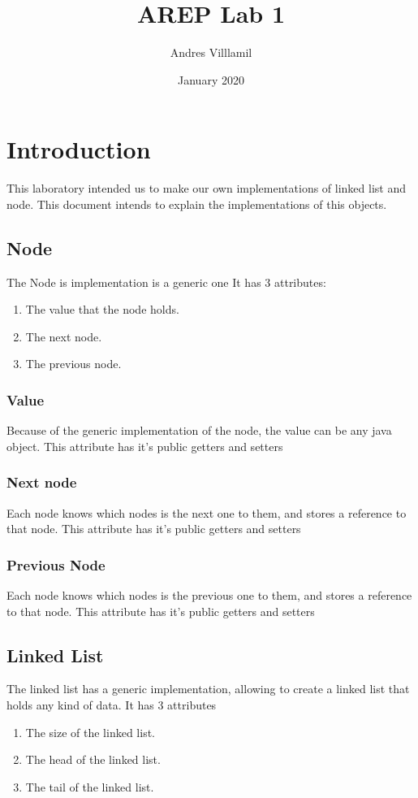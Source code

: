 \documentclass{article}
\title{AREP Lab 1}
\author{Andres Villlamil }
\date{January 2020}
\begin{document}
\maketitle

\section{Introduction}
This laboratory intended us to make our own implementations of linked list and node. This document intends to explain the implementations of this objects.


\subsection{Node}
The Node is implementation is a generic one
It has 3 attributes:
\begin{enumerate}
    \item The value that the node holds.
    \item The next node.
    \item The previous node.
\end{enumerate}

\subsubsection{Value}
Because of the generic implementation of the node, the value can be any java object.
This attribute has it's public getters and setters

\subsubsection{Next node}
Each node knows which nodes is the next one to them, and stores a reference to that node.
This attribute has it's public getters and setters
\subsubsection{Previous Node}
Each node knows which nodes is the previous one to them, and stores a reference to that node.
This attribute has it's public getters and setters

\subsection{Linked List}
The linked list has a generic implementation, allowing to create a linked list that holds any kind of data.
It has 3 attributes
\begin{enumerate}
    \item The size of the linked list.
    \item The head of the linked list.
    \item The tail of the linked list.
\end{enumerate}
\end{document}
